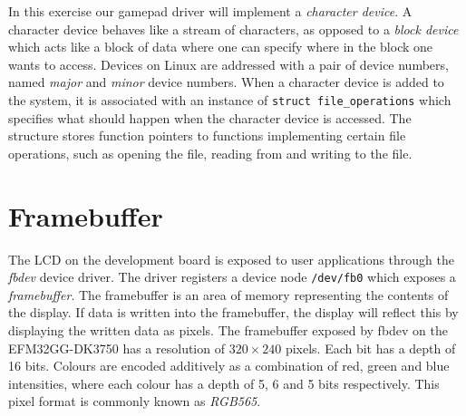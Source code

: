 In this exercise our gamepad driver will implement a \emph{character device}. A
character device behaves like a stream of characters, as opposed to a
\emph{block device} which acts like a block of data where one can specify where
in the block one wants to access. Devices on Linux are addressed with a pair of
device numbers, named \emph{major} and \emph{minor} device numbers. When a
character device is added to the system, it is associated with an instance of
\texttt{struct file\_operations} which specifies what should happen when the
character device is accessed. The structure stores function pointers to
functions implementing certain file operations, such as opening the file,
reading from and writing to the file.

\section{Framebuffer}

The LCD on the development board is exposed to user applications through the
\emph{fbdev} device driver. The driver registers a device node \texttt{/dev/fb0}
which exposes a \emph{framebuffer}. The framebuffer is an area of memory
representing the contents of the display. If data is written into the
framebuffer, the display will reflect this by displaying the written data as
pixels. The framebuffer exposed by fbdev on the EFM32GG-DK3750 has a resolution
of \(320 \times 240\) pixels. Each bit has a depth of 16 bits. Colours are
encoded additively as a combination of red, green and blue intensities, where
each colour has a depth of 5, 6 and 5 bits respectively. This pixel format is
commonly known as \emph{RGB565}.
